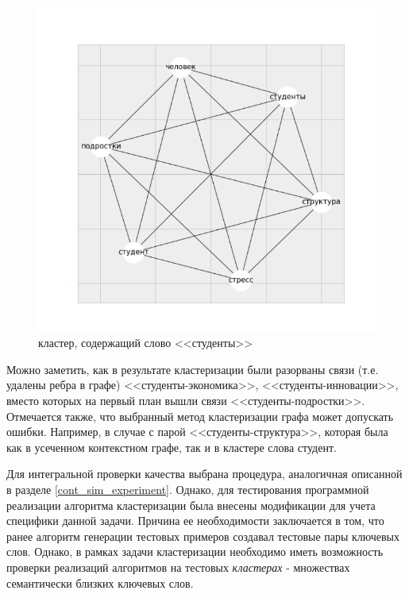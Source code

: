 \begin{figure}[ht]
  \begin{minipage}[ht]{1.0\linewidth}\centering
    \includegraphics[width=1.0\linewidth]{Dissertation/pics/students_cluster}
    \caption{кластер, содержащий слово <<студенты>>}
    \label{img:clust_1}
  \end{minipage}
\end{figure}

Можно заметить, как в результате кластеризации были разорваны связи (т.е. удалены ребра в графе) <<студенты-экономика>>,  <<студенты-инновации>>, вместо которых на первый план вышли связи <<студенты-подростки>>. Отмечается также, что выбранный метод кластеризации графа может допускать ошибки. Например, в случае с парой <<студенты-структура>>, которая была как в усеченном контекстном графе, так и в кластере слова студент.

Для интегральной проверки качества выбрана процедура, аналогичная описанной в разделе \ref{cont_sim_experiment}. Однако, для тестирования программной реализации алгоритма кластеризации была внесены модификации для учета специфики данной задачи. Причина ее необходимости заключается в том, что ранее алгоритм генерации тестовых примеров создавал тестовые пары ключевых слов. Однако, в рамках задачи кластеризации необходимо иметь возможность проверки реализаций алгоритмов на тестовых \emph{кластерах} - множествах семантически близких ключевых слов. 


